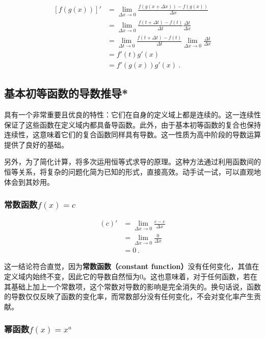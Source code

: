 \begin{equation}
\begin{split}
\left[f(g(x))\right]'&=\lim_{\Delta x\to 0}\frac{f(g(x+\Delta x))-f(g(x))}{\Delta x}\\
&=\lim_{\Delta x\to 0}\frac{f(t+\Delta t)-f(t)}{\Delta t}\frac{\Delta t}{\Delta x}\\
&=\lim_{\Delta t\to 0}\frac{f(t+\Delta t)-f(t)}{\Delta t}\lim_{\Delta x\to 0}\frac{\Delta t}{\Delta x}\\
&=f'(t) g'(x)\\
&=f'(g(x)) g'(x)~.
\end{split}
\end{equation}
\subsection{基本初等函数的导数推导*}

具有一个非常重要且优良的特性：它们在自身的定义域上都是连续的。这一连续性保证了这些函数在定义域内都具备导函数。此外，由于基本初等函数的复合也保持连续性，这意味着它们的复合函数同样具有导数。这一性质为高中阶段的导数运算提供了良好的基础。

另外，为了简化计算，将多次运用恒等式求导的原理。这种方法通过利用函数间的恒等关系，将复杂的问题化简为已知的形式，直接高效。动手试一试，可以直观地体会到其妙用。

\subsubsection{常数函数$f(x)=c$}

\begin{equation}
\begin{split}
(c)'&=\lim_{\Delta x\to 0}\frac{c-c}{\Delta x}\\
&=\lim_{\Delta x\to 0}\frac{0}{\Delta x}\\
&=0~.
\end{split}
\end{equation}

这一结论符合直觉，因为\textbf{常数函数（constant function）}没有任何变化，其值在定义域内始终不变，因此它的导数自然恒为0。这也意味着，对于任何函数，若在其基础上加上一个常数项，这个常数对导数的影响是完全消失的。换句话说，函数的导数仅仅反映了函数的变化率，而常数部分没有任何变化，不会对变化率产生贡献。

\subsubsection{幂函数$f(x)=x^a$}

